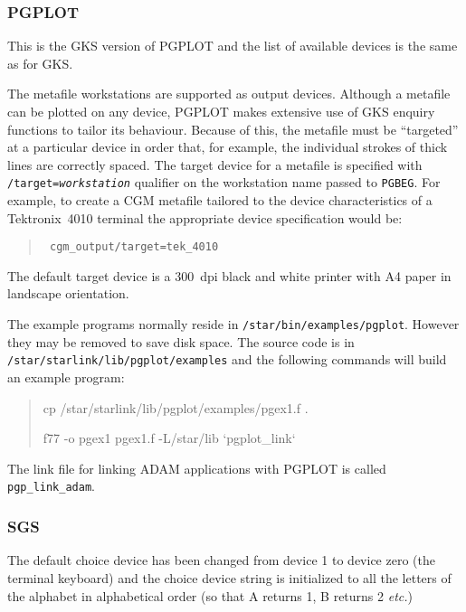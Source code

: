 \subsubsection{PGPLOT}

This is the GKS version of PGPLOT and the list of available devices is the same
as for GKS.

The metafile workstations are supported as output devices. Although a
metafile can be plotted on any device, PGPLOT makes extensive use of GKS
enquiry functions to tailor its behaviour. Because of this, the metafile 
must be
``targeted'' at a particular device in order that, for example, the individual
strokes of thick lines are correctly spaced. The target device for a metafile
is specified with {\tt /target={\em workstation\/}} qualifier on the workstation
name passed to {\tt PGBEG}. For example, to create a CGM metafile tailored to
the device characteristics of a Tektronix~4010 terminal the appropriate device
specification would be:
\begin{quote}\tt
cgm\_output/target=tek\_4010
\end{quote}
The default target device is a 300~dpi black and white printer with A4 paper in
landscape orientation.
 
The example programs normally reside in {\tt /star/bin/examples/pgplot}.
However they may be 
removed to save disk space. The source code is in {\tt 
/star/starlink/lib/pgplot/examples} and the following commands will build an 
example program:

\begin{quote}\tt

cp /star/starlink/lib/pgplot/examples/pgex1.f .

f77 -o pgex1 pgex1.f -L/star/lib `pgplot\_link`

\end{quote}

The link file for linking ADAM applications with PGPLOT is called {\tt
pgp\_link\_adam}.

\subsubsection{SGS}

The default choice device has been changed from device 1 to device zero (the 
terminal keyboard) and the choice device string is initialized to all the
letters of the alphabet in alphabetical order (so that A returns 1, B returns 
2 {\it etc.})
                                                          
